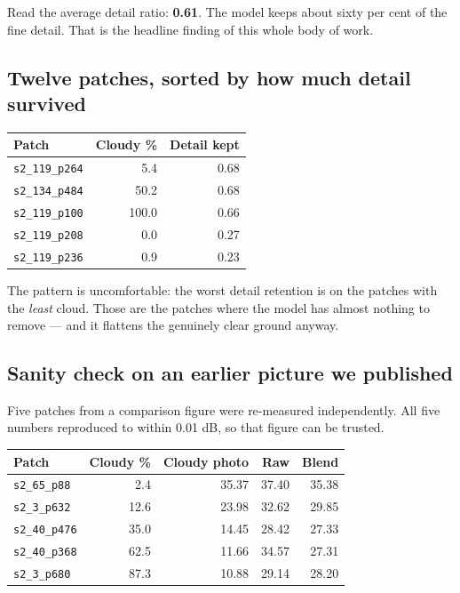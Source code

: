 \documentclass[11pt,a4paper]{article}
\newcommand{\code}[1]{\texttt{#1}}
\begin{document}
Read the average detail ratio: \textbf{0.61}. The model keeps about sixty per cent of the fine
detail. That is the headline finding of this whole body of work.

\subsection{Twelve patches, sorted by how much detail survived}

\begin{center}
\begin{tabular}{@{}lrr@{}}
\hline
Patch & Cloudy \% & Detail kept \\
\hline
\code{s2\_119\_p264} & 5.4 & 0.68 \\
\code{s2\_134\_p484} & 50.2 & 0.68 \\
\code{s2\_119\_p100} & 100.0 & 0.66 \\
\code{s2\_119\_p208} & 0.0 & 0.27 \\
\code{s2\_119\_p236} & 0.9 & 0.23 \\
\hline
\end{tabular}
\end{center}

The pattern is uncomfortable: the worst detail retention is on the patches with the \emph{least}
cloud. Those are the patches where the model has almost nothing to remove --- and it flattens the
genuinely clear ground anyway.

\subsection{Sanity check on an earlier picture we published}

Five patches from a comparison figure were re-measured independently. All five numbers reproduced to
within 0.01 dB, so that figure can be trusted.

\begin{center}
\begin{tabular}{@{}lrrrr@{}}
\hline
Patch & Cloudy \% & Cloudy photo & Raw & Blend \\
\hline
\code{s2\_65\_p88} & 2.4 & 35.37 & 37.40 & 35.38 \\
\code{s2\_3\_p632} & 12.6 & 23.98 & 32.62 & 29.85 \\
\code{s2\_40\_p476} & 35.0 & 14.45 & 28.42 & 27.33 \\
\code{s2\_40\_p368} & 62.5 & 11.66 & 34.57 & 27.31 \\
\code{s2\_3\_p680} & 87.3 & 10.88 & 29.14 & 28.20 \\
\hline
\end{tabular}
\end{center}
\end{document}
